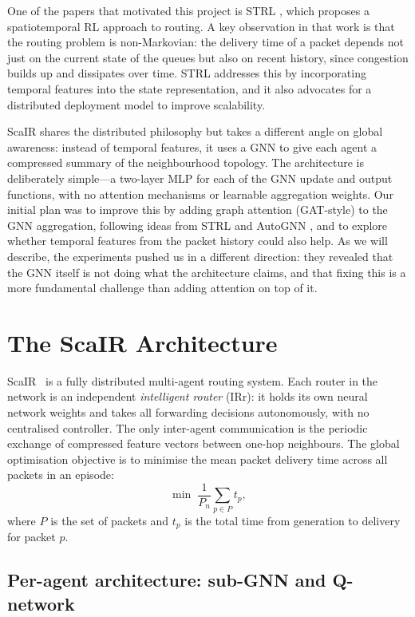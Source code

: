 \documentclass[10pt,twocolumn,letterpaper]{article}
\begin{document}
One of the papers that motivated this project is STRL
\cite{strl}, which proposes a spatiotemporal RL approach to routing. A
key observation in that work is that the routing problem is
non-Markovian: the delivery time of a packet depends not just on the
current state of the queues but also on recent history, since congestion
builds up and dissipates over time. STRL addresses this by incorporating
temporal features into the state representation, and it also advocates
for a distributed deployment model to improve scalability.

ScaIR \cite{scair2025} shares the distributed philosophy but takes a
different angle on global awareness: instead of temporal features, it
uses a GNN to give each agent a compressed summary of the neighbourhood
topology. The architecture is deliberately simple---a two-layer MLP for
each of the GNN update and output functions, with no attention
mechanisms or learnable aggregation weights. Our initial plan was to
improve this by adding graph attention (GAT-style) to the GNN
aggregation, following ideas from STRL and AutoGNN \cite{autognn}, and
to explore whether temporal features from the packet history could also
help. As we will describe, the experiments pushed us in a different
direction: they revealed that the GNN itself is not doing what the
architecture claims, and that fixing this is a more fundamental
challenge than adding attention on top of it.

\section{The ScaIR Architecture}
\label{sec:arch}

ScaIR~\cite{scair2025} is a fully distributed multi-agent routing
system. Each router in the network is an independent
\emph{intelligent router} (IRr): it holds its own neural network
weights and takes all forwarding decisions autonomously, with no
centralised controller. The only inter-agent communication is the
periodic exchange of compressed feature vectors between one-hop
neighbours. The global optimisation objective is to minimise the mean
packet delivery time across all packets in an episode:
\begin{equation}
  \min \;\frac{1}{P_n}\sum_{p \in P} t_p,
  \label{eq:obj}
\end{equation}
where $P$ is the set of packets and $t_p$ is the total time from
generation to delivery for packet $p$.

\subsection{Per-agent architecture: sub-GNN and Q-network}
\end{document}
